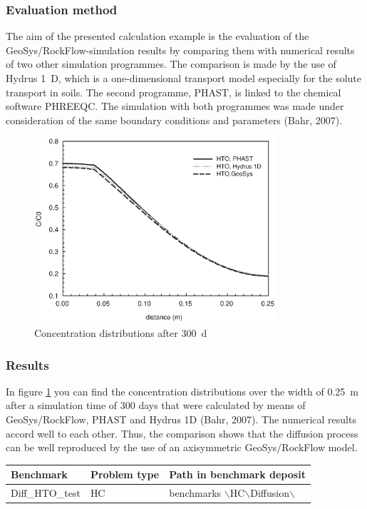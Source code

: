 \subsubsection*{Evaluation method}
The aim of the presented calculation example is the evaluation of the GeoSys/RockFlow-simulation results by comparing them with numerical results of two other simulation programmes. The comparison is made by the use of Hydrus 1~D, which is a one-dimensional transport model especially for the solute transport in soils. The second programme, PHAST, is linked to the chemical software PHREEQC. The simulation with both programmes was made under consideration of the same boundary conditions and parameters (Bahr, 2007).

\begin{figure}[htbp]
\centering
\includegraphics[width=0.8\textwidth]{C/figures/fig510.EPS}
\caption{Concentration distributions after 300~d}
\label{fig510}
\end{figure}

\subsubsection*{Results}

In figure \ref{fig510} you can find the concentration distributions over the width of 0.25~m after a simulation time of 300 days that were calculated by means of GeoSys/RockFlow, PHAST and Hydrus 1D (Bahr, 2007). The numerical results accord well to each other. Thus, the comparison shows that the diffusion process can be well reproduced by the use of an axisymmetric GeoSys/RockFlow model.

\begin{tabular}{|l|l|l|}
\hline
Benchmark & Problem type	& Path in benchmark deposit \\
\hline	
Diff\_HTO\_test	& HC	& benchmarks $\backslash$HC$\backslash$Diffusion$\backslash$ \\
\hline	
\end{tabular}
